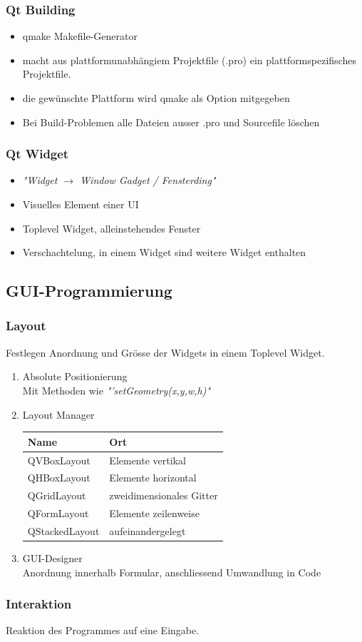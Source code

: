\subsubsection{Qt Building}
\begin{itemize}
	\item qmake Makefile-Generator
	\item macht aus plattformunabhängiem Projektfile (.pro) ein plattformspezifisches Projektfile. 
	\item die gewünschte Plattform wird qmake als Option mitgegeben
	\item Bei Build-Problemen alle Dateien ausser .pro und Sourcefile löschen
\end{itemize}

\subsubsection{Qt Widget}
\begin{itemize}
	\item \textit{"Widget $\rightarrow$ Window Gadget / Fensterding"}
	\item Visuelles Element einer UI
	\item Toplevel Widget, alleinstehendes Fenster 
	\item Verschachtelung, in einem Widget sind weitere Widget enthalten
\end{itemize}

\subsection{GUI-Programmierung}
\subsubsection{Layout}
Festlegen Anordnung und Grösse der Widgets in einem Toplevel Widget.
\begin{enumerate}
	\item Absolute Positionierung\\
	Mit Methoden wie \textit{"'setGeometry(x,y,w,h)"}	
	\item Layout Manager\\
	\begin{tabular}{|l|l|}
		\hline \textbf{Name} & \textbf{Ort}\\
		\hline QVBoxLayout & Elemente vertikal\\
		\hline QHBoxLayout & Elemente horizontal\\
		\hline QGridLayout & zweidimensionales Gitter\\
		\hline QFormLayout & Elemente zeilenweise\\
		\hline QStackedLayout & aufeinandergelegt\\
		\hline
	\end{tabular}
	\item GUI-Designer\\
	Anordnung innerhalb Formular, anschliessend Umwandlung in Code	
\end{enumerate}

\subsubsection{Interaktion}
Reaktion des Programmes auf eine Eingabe.